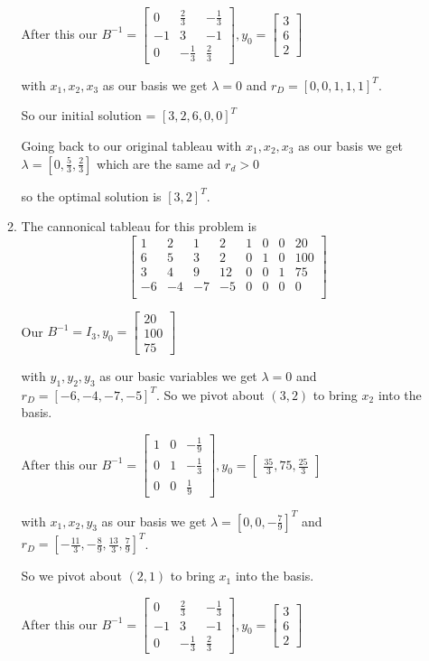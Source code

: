 \documentclass[10pt,a4paper]{article}
\newcommand\m[1]{\begin{bmatrix}#1\end{bmatrix}}
\begin{document}
\begin{enumerate}
\begin{enumerate}
        After this our $B^{-1} = \m{0 & \frac{2}{3}  & -\frac{1}{3} \\ -1 & 3 & -1 \\  0 & -\frac{1}{3} & \frac{2}{3}}, y_0 = \m{3 \\ 6 \\2}$

        with $x_1, x_2, x_3$ as our basis we get $\lambda = 0$ and $r_D = [0, 0, 1, 1, 1]^T$.

        So our initial solution = $[3, 2, 6, 0, 0]^T$

        Going back to our original tableau with $x_1, x_2, x_3$ as our basis we get $\lambda = [0, \frac{5}{3}, \frac{2}{3}]$ which are the same ad $r_d > 0$

        so the optimal solution is $[3, 2]^T$.

        \item The cannonical tableau for this problem is 
         $$\m{1 & 2 & 1 & 2 & 1 & 0 & 0 & 20 \\
              6 & 5 & 3 & 2 & 0 & 1  & 0& 100 \\
              3 & 4 & 9 & 12 & 0 & 0&1 & 75 \\
              -6 & -4 & -7 & -5 & 0 & 0&0  &0 \\
               
         }$$

        Our $B^{-1} = I_3, y_0 = \m{20 \\ 100 \\75}$ 

        with $y_1, y_2, y_3$ as our basic variables we get $\lambda = 0$ and $r_D = [-6, -4, -7, -5]^T$.
        So we pivot about $(3, 2)$ to bring $x_2$ into the basis.

        After this our $B^{-1} = \m{1 & 0 & -\frac{1}{9} \\ 0 & 1 & -\frac{1}{3} \\ 0 & 0 & \frac{1}{9}}, y_0 = \m{\frac{35}{3}, 75, \frac{25}{3}}$

        with $x_1, x_2, y_3$ as our basis we get $\lambda = [0, 0, -\frac{7}{9}]^T$ and $r_D = [-\frac{11}{3}, -\frac{8}{9}, \frac{13}{3}, \frac{7}{9}]^T$.

        So we pivot about $(2, 1)$ to bring $x_1$ into the basis.

        After this our $B^{-1} = \m{0 & \frac{2}{3}  & -\frac{1}{3} \\ -1 & 3 & -1 \\  0 & -\frac{1}{3} & \frac{2}{3}}, y_0 = \m{3 \\ 6 \\2}$


\end{enumerate}
\end{enumerate}
\end{document}
